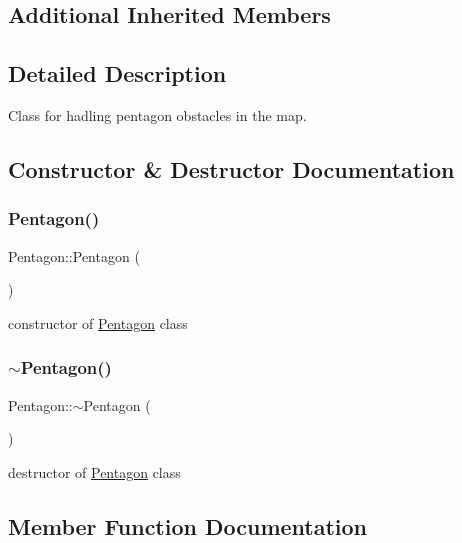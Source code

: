 \subsection*{Additional Inherited Members}


\subsection{Detailed Description}
Class for hadling pentagon obstacles in the map. 

\subsection{Constructor \& Destructor Documentation}
\mbox{\label{class_pentagon_a1c5596d8ff548bfcdccc7fa53b81355c}} 
\subsubsection{\texorpdfstring{Pentagon()}{Pentagon()}}
{\footnotesize\ttfamily Pentagon\+::\+Pentagon (\begin{DoxyParamCaption}{ }\end{DoxyParamCaption})}

constructor of \mbox{\hyperlink{class_pentagon}{Pentagon}} class \mbox{\label{class_pentagon_a500031431177cee506fd7f0517d84753}} 
\subsubsection{\texorpdfstring{$\sim$\+Pentagon()}{~Pentagon()}}
{\footnotesize\ttfamily Pentagon\+::$\sim$\+Pentagon (\begin{DoxyParamCaption}{ }\end{DoxyParamCaption})}

destructor of \mbox{\hyperlink{class_pentagon}{Pentagon}} class 

\subsection{Member Function Documentation}
\mbox{\label{class_pentagon_ab38482973f796da34cd9ac62cefb1491}} 
